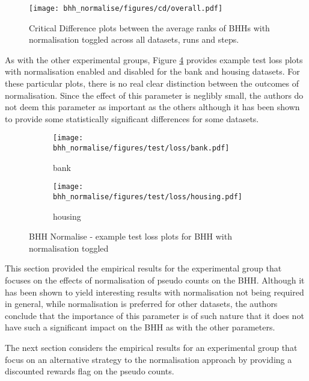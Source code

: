 \begin{figure}[htbp]
      \centering
      \texttt{[image: bhh\_normalise/figures/cd/overall.pdf]}
      \caption{Critical Difference plots between the average ranks of \Acsp{BHH} with normalisation toggled across all datasets, runs and steps.}
      \label{fig:results:normalise:descriptive:cd}
\end{figure}

As with the other experimental groups, Figure \ref{fig:results:normalise:figures:loss} provides example test loss plots with normalisation enabled and disabled for the bank and housing datasets. For these particular plots, there is no real clear distinction between the outcomes of normalisation. Since the effect of this parameter is neglibly small, the authors do not deem this parameter as important as the others although it has been shown to provide some statistically significant differences for some datasets.


\begin{figure}[htbp]
      \begin{subfigure}{0.5\textwidth}
            \centering
            \texttt{[image: bhh\_normalise/figures/test/loss/bank.pdf]}
            \caption{bank}
            \label{fig:results:normalise:figures:loss1}
      \end{subfigure}
      \begin{subfigure}{0.5\textwidth}
            \centering
            \texttt{[image: bhh\_normalise/figures/test/loss/housing.pdf]}
            \caption{housing}
            \label{fig:results:normalise:figures:loss2}
      \end{subfigure}
      \caption{\Acs{BHH} Normalise - example test loss plots for \Acs{BHH} with normalisation toggled}
      \label{fig:results:normalise:figures:loss}
\end{figure}


This section provided the empirical results for the experimental group that focuses on the effects of normalisation of pseudo counts on the \Ac{BHH}. Although it has been shown to yield interesting results with normalisation not being required in general, while normalisation is preferred for other datasets, the authors conclude that the importance of this parameter is of such nature that it does not have such a significant impact on the \Ac{BHH} as with the other parameters.

The next section considers the empirical results for an experimental group that focus on an alternative strategy to the normalisation approach by providing a discounted rewards flag on the pseudo counts.
















